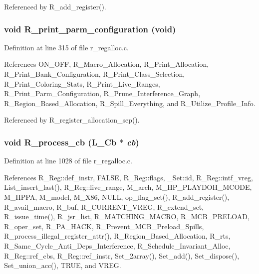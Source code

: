 Referenced by R\_\-add\_\-register().
\subsubsection{\setlength{\rightskip}{0pt plus 5cm}void R\_\-print\_\-parm\_\-configuration (void)}\label{r__regalloc_8c_b1f91d964377d95cc9045270fb9b3e8e}




Definition at line 315 of file r\_\-regalloc.c.

References ON\_\-OFF, R\_\-Macro\_\-Allocation, R\_\-Print\_\-Allocation, R\_\-Print\_\-Bank\_\-Configuration, R\_\-Print\_\-Class\_\-Selection, R\_\-Print\_\-Coloring\_\-Stats, R\_\-Print\_\-Live\_\-Ranges, R\_\-Print\_\-Parm\_\-Configuration, R\_\-Prune\_\-Interference\_\-Graph, R\_\-Region\_\-Based\_\-Allocation, R\_\-Spill\_\-Everything, and R\_\-Utilize\_\-Profile\_\-Info.

Referenced by R\_\-register\_\-allocation\_\-sep().
\subsubsection{\setlength{\rightskip}{0pt plus 5cm}void R\_\-process\_\-cb (L\_\-Cb $\ast$ {\em cb})}\label{r__regalloc_8c_a2589ae2b8f1569072cb6b4c1c335511}




Definition at line 1028 of file r\_\-regalloc.c.

References R\_\-Reg::def\_\-instr, FALSE, R\_\-Reg::flags, \_\-Set::id, R\_\-Reg::intf\_\-vreg, List\_\-insert\_\-last(), R\_\-Reg::live\_\-range, M\_\-arch, M\_\-HP\_\-PLAYDOH\_\-MCODE, M\_\-HPPA, M\_\-model, M\_\-X86, NULL, op\_\-flag\_\-set(), R\_\-add\_\-register(), R\_\-avail\_\-macro, R\_\-buf, R\_\-CURRENT\_\-VREG, R\_\-extend\_\-set, R\_\-issue\_\-time(), R\_\-jsr\_\-list, R\_\-MATCHING\_\-MACRO, R\_\-MCB\_\-PRELOAD, R\_\-oper\_\-set, R\_\-PA\_\-HACK, R\_\-Prevent\_\-MCB\_\-Preload\_\-Spills, R\_\-process\_\-illegal\_\-register\_\-attr(), R\_\-Region\_\-Based\_\-Allocation, R\_\-rts, R\_\-Same\_\-Cycle\_\-Anti\_\-Deps\_\-Interference, R\_\-Schedule\_\-Invariant\_\-Alloc, R\_\-Reg::ref\_\-cbs, R\_\-Reg::ref\_\-instr, Set\_\-2array(), Set\_\-add(), Set\_\-dispose(), Set\_\-union\_\-acc(), TRUE, and VREG.

